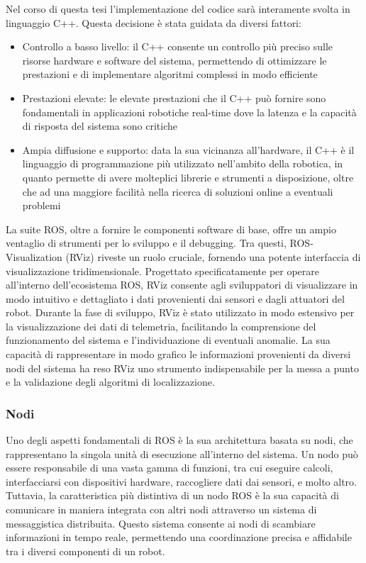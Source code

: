 \noindent Nel corso di questa tesi l'implementazione del codice sarà interamente svolta in linguaggio C++. Questa decisione è stata guidata da diversi fattori:

\begin{itemize}
  \item Controllo a basso livello: il C++ consente un controllo più preciso sulle risorse hardware e software del sistema, permettendo di ottimizzare le prestazioni e di implementare algoritmi complessi in modo efficiente
  \item Prestazioni elevate: le elevate prestazioni che il C++ può fornire sono fondamentali in applicazioni robotiche real-time dove la latenza e la capacità di risposta del sistema sono critiche
  \item Ampia diffusione e supporto: data la sua vicinanza all'hardware, il C++ è il linguaggio di programmazione più utilizzato nell'ambito della robotica, in quanto permette di avere molteplici librerie e strumenti a disposizione, oltre che ad una maggiore facilità nella ricerca di soluzioni online a eventuali problemi
\end{itemize}

\noindent La suite ROS, oltre a fornire le componenti software di base, offre un ampio ventaglio di strumenti per lo sviluppo e il debugging. Tra questi, ROS-Visualization (RViz) riveste un ruolo cruciale, fornendo una potente interfaccia di visualizzazione tridimensionale. Progettato specificatamente per operare all'interno dell'ecosistema ROS, RViz consente agli sviluppatori di visualizzare in modo intuitivo e dettagliato i dati provenienti dai sensori e dagli attuatori del robot. Durante la fase di sviluppo, RViz è stato utilizzato in modo estensivo per la visualizzazione dei dati di telemetria, facilitando la comprensione del funzionamento del sistema e l'individuazione di eventuali anomalie. La sua capacità di rappresentare in modo grafico le informazioni provenienti da diversi nodi del sistema ha reso RViz uno strumento indispensabile per la messa a punto e la validazione degli algoritmi di localizzazione.

\subsubsection{Nodi}
\noindent Uno degli aspetti fondamentali di ROS è la sua architettura basata su nodi, che rappresentano la singola unità di esecuzione all'interno del sistema. Un nodo può essere responsabile di una vasta gamma di funzioni, tra cui eseguire calcoli, interfacciarsi con dispositivi hardware, raccogliere dati dai sensori, e molto altro. Tuttavia, la caratteristica più distintiva di un nodo ROS è la sua capacità di comunicare in maniera integrata con altri nodi attraverso un sistema di messaggistica distribuita. Questo sistema consente ai nodi di scambiare informazioni in tempo reale, permettendo una coordinazione precisa e affidabile tra i diversi componenti di un robot.

